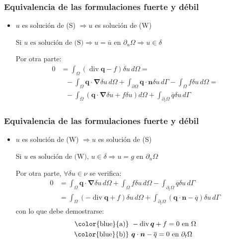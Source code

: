 \documentclass{beamer}
\begin{document}
\begin{frame}
\frametitle{Equivalencia de las formulaciones fuerte y débil}
\begin{itemize}
\item[1.] $u$ es solución de (S) $\Rightarrow u$ es solución de (W)

Si $u \textrm{ es solución de (S)} \Rightarrow u=\overline{u} \textrm{ en }
\partial_u \Omega \Rightarrow u \in \delta$

Por otra parte:
\begin{align*}
0&= \int_{\Omega} \left( \operatorname{div} \bm{q} -f \right) \delta u \, d \Omega= \\
 &\mbox{ } -\int_{\Omega} \bm{q} \cdot \bm{\nabla} \delta u \, d \Omega+
\int_{\partial \Omega} \bm{q} \cdot \bm{n} \delta u \, d \Gamma -
\int_{\Omega} f \delta u \, d\Omega= \\
 &\mbox{ } - \int_{\Omega} \left(
\bm{q} \cdot \bm{\nabla} \delta u + f \delta u \right) 
d \Omega+
\int_{\partial_t \Omega} \overline{q} \delta u \, d \Gamma
\end{align*}
\end{itemize}
\end{frame}
\begin{frame}
\frametitle{Equivalencia de las formulaciones fuerte y débil}
\begin{itemize}
\item[2.] $u$ es solución de (W) $\Rightarrow u$ es solución de (S)

Si $u \textrm{ es solución de (W), } u \in \delta \Rightarrow u=g \textrm{ en }
\partial_u \Omega$

Por otra parte, $\forall \delta u \in \nu$ se verifica:
\begin{align}
0&= \int_{\Omega} \bm{q} \cdot \bm{\nabla} \delta u \, d \Omega+
\int_{\Omega} f \delta u \, d\Omega -
\int_{\partial_t \Omega} \overline{q} \delta u \, d \Gamma \nonumber \\
&= \int_{\Omega} \left( -\operatorname{div} \bm{q} +f \right) \delta u \, d \Omega+
\int_{\partial_t \Omega} \left(\bm{q}\cdot \bm{n} - \overline{q}
\right) \delta u \, d \Gamma
\label{auxequi}
\end{align}
con lo que debe demostrarse:
\begin{align*}
\textrm{\color{blue}{a)} }&-\operatorname{div} \bm{q} +f=0 \textrm{ en } \Omega \\
\textrm{\color{blue}{b)} }&\bm{q}\cdot \bm{n} - \overline{q}=0 \textrm{ en } \partial_t \Omega
\end{align*}
\end{itemize}
\end{frame}
\end{document}
